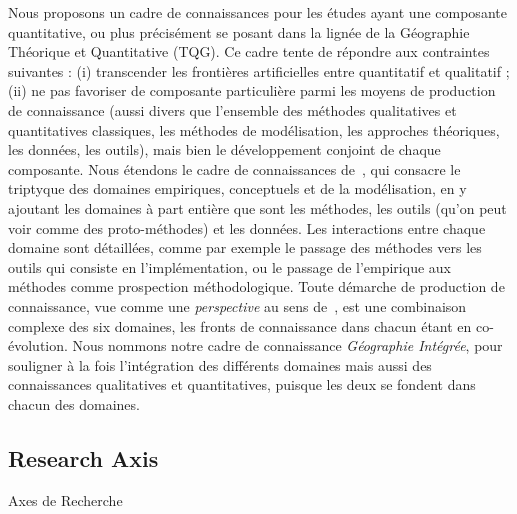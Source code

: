 Nous proposons un cadre de connaissances pour les études ayant une composante quantitative, ou plus précisément se posant dans la lignée de la Géographie Théorique et Quantitative (TQG). Ce cadre tente de répondre aux contraintes suivantes : (i) transcender les frontières artificielles entre quantitatif et qualitatif ; (ii) ne pas favoriser de composante particulière parmi les moyens de production de connaissance (aussi divers que l'ensemble des méthodes qualitatives et quantitatives classiques, les méthodes de modélisation, les approches théoriques, les données, les outils), mais bien le développement conjoint de chaque composante. Nous étendons le cadre de connaissances de~\cite{livet2010ontology}, qui consacre le triptyque des domaines empiriques, conceptuels et de la modélisation, en y ajoutant les domaines à part entière que sont les méthodes, les outils (qu'on peut voir comme des proto-méthodes) et les données. Les interactions entre chaque domaine sont détaillées, comme par exemple le passage des méthodes vers les outils qui consiste en l'implémentation, ou le passage de l'empirique aux méthodes comme prospection méthodologique. Toute démarche de production de connaissance, vue comme une \emph{perspective} au sens de~\cite{giere2010scientific}, est une combinaison complexe des six domaines, les fronts de connaissance dans chacun étant en co-évolution. Nous nommons notre cadre de connaissance \emph{Géographie Intégrée}, pour souligner à la fois l'intégration des différents domaines mais aussi des connaissances qualitatives et quantitatives, puisque les deux se fondent dans chacun des domaines.








\subsection{Research Axis}{Axes de Recherche}








